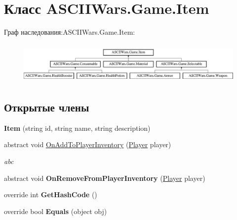 \hypertarget{class_a_s_c_i_i_wars_1_1_game_1_1_item}{}\section{Класс A\+S\+C\+I\+I\+Wars.\+Game.\+Item}
\label{class_a_s_c_i_i_wars_1_1_game_1_1_item}
Граф наследования\+:A\+S\+C\+I\+I\+Wars.\+Game.\+Item\+:\begin{figure}[H]
\begin{center}
\leavevmode
\includegraphics[height=2.100000cm]{class_a_s_c_i_i_wars_1_1_game_1_1_item}
\end{center}
\end{figure}
\subsection*{Открытые члены}
\begin{DoxyCompactItemize}
\item 
\hypertarget{class_a_s_c_i_i_wars_1_1_game_1_1_item_ae9b7ebce1c577c6d4e142f7d8f736ec5}{}\label{class_a_s_c_i_i_wars_1_1_game_1_1_item_ae9b7ebce1c577c6d4e142f7d8f736ec5} 
{\bfseries Item} (string id, string name, string description)
\item 
\hypertarget{class_a_s_c_i_i_wars_1_1_game_1_1_item_aec0355b7a9f647ef24897b95563f70d1}{}\label{class_a_s_c_i_i_wars_1_1_game_1_1_item_aec0355b7a9f647ef24897b95563f70d1} 
abstract void \hyperlink{class_a_s_c_i_i_wars_1_1_game_1_1_item_aec0355b7a9f647ef24897b95563f70d1}{On\+Add\+To\+Player\+Inventory} (\hyperlink{class_a_s_c_i_i_wars_1_1_game_1_1_player}{Player} player)
\begin{DoxyCompactList}\small\item\em abc \end{DoxyCompactList}\item 
\hypertarget{class_a_s_c_i_i_wars_1_1_game_1_1_item_a52412546f837bfc65a3aa9d728fa142f}{}\label{class_a_s_c_i_i_wars_1_1_game_1_1_item_a52412546f837bfc65a3aa9d728fa142f} 
abstract void {\bfseries On\+Remove\+From\+Player\+Inventory} (\hyperlink{class_a_s_c_i_i_wars_1_1_game_1_1_player}{Player} player)
\item 
\hypertarget{class_a_s_c_i_i_wars_1_1_game_1_1_item_aa503cb0e59f19deb5124271048735de4}{}\label{class_a_s_c_i_i_wars_1_1_game_1_1_item_aa503cb0e59f19deb5124271048735de4} 
override int {\bfseries Get\+Hash\+Code} ()
\item 
\hypertarget{class_a_s_c_i_i_wars_1_1_game_1_1_item_a8a91f74db078fbb15657f28ef92155f8}{}\label{class_a_s_c_i_i_wars_1_1_game_1_1_item_a8a91f74db078fbb15657f28ef92155f8} 
override bool {\bfseries Equals} (object obj)
\end{DoxyCompactItemize}
